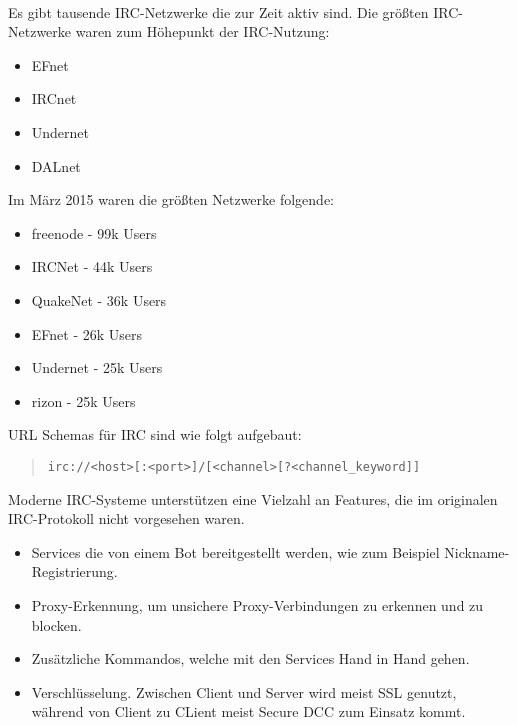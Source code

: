 \\
Es gibt tausende IRC-Netzwerke die zur Zeit aktiv sind. Die größten IRC-Netzwerke waren zum Höhepunkt der IRC-Nutzung:
\begin{itemize}
\item EFnet
\item IRCnet
\item Undernet
\item DALnet
\end{itemize}
Im März 2015 waren die größten Netzwerke folgende:
\begin{itemize}
\item freenode - 99k Users
\item IRCNet - 44k Users
\item QuakeNet - 36k Users
\item EFnet - 26k Users
\item Undernet - 25k Users
\item rizon - 25k Users
\end{itemize}
URL Schemas für IRC sind wie folgt aufgebaut:
\begin{quote}
\verb|irc://<host>[:<port>]/[<channel>[?<channel_keyword]]|
\end{quote}
Moderne IRC-Systeme unterstützen eine Vielzahl an Features, die im originalen IRC-Protokoll nicht vorgesehen waren.
\begin{itemize}
\item Services die von einem Bot bereitgestellt werden, wie zum Beispiel Nickname-Registrierung.
\item Proxy-Erkennung, um unsichere Proxy-Verbindungen zu erkennen und zu blocken.
\item Zusätzliche Kommandos, welche mit den Services Hand in Hand gehen.
\item Verschlüsselung. Zwischen Client und Server wird meist SSL genutzt, während von Client zu CLient meist Secure DCC zum Einsatz kommt.
\end{itemize}
